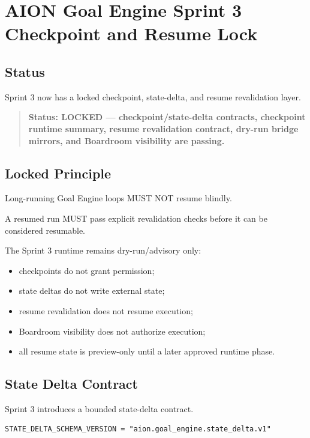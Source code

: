 \section{AION Goal Engine Sprint 3 Checkpoint and Resume Lock}
\label{sec:aion-goal-engine-sprint3-checkpoint-resume-lock}

\subsection{Status}

Sprint 3 now has a locked checkpoint, state-delta, and resume revalidation layer.

\begin{quote}
\textbf{Status: LOCKED --- checkpoint/state-delta contracts, checkpoint runtime summary, resume revalidation contract, dry-run bridge mirrors, and Boardroom visibility are passing.}
\end{quote}

\subsection{Locked Principle}

Long-running Goal Engine loops MUST NOT resume blindly.

A resumed run MUST pass explicit revalidation checks before it can be considered resumable.

The Sprint 3 runtime remains dry-run/advisory only:

\begin{itemize}
  \item checkpoints do not grant permission;
  \item state deltas do not write external state;
  \item resume revalidation does not resume execution;
  \item Boardroom visibility does not authorize execution;
  \item all resume state is preview-only until a later approved runtime phase.
\end{itemize}

\subsection{State Delta Contract}

Sprint 3 introduces a bounded state-delta contract.

\begin{verbatim}
STATE_DELTA_SCHEMA_VERSION = "aion.goal_engine.state_delta.v1"
\end{verbatim}


